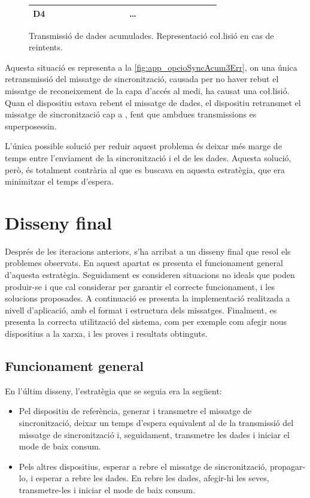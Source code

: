 \documentclass{tfgitic}[2024/07/01]
\begin{document}
{\begin{figure}[ht]
{\begin{tabular}{!{\vrule width \heavyrulewidth}c!{\vrule width \heavyrulewidth}ccccccccccc!{\vrule width \heavyrulewidth}}
{D4} & ~~~~~~~~~~~~~~ & & ~~~~~~~~~~~~~~\\

\toprule
\end{tabular}
}
    \caption{Transmissió de dades acumulades. Representació co\l.lisió en cas de reintents.}
    \label{fig:app_opcioSyncAcum3Err}
\end{figure}

Aquesta situació es representa a la \autoref{fig:app_opcioSyncAcum3Err}, on una única retransmissió del missatge de sincronització, causada per no haver rebut el missatge de reconeixement de la capa d'accés al medi, ha causat una co\l.lisió. Quan el dispositiu  estava rebent el missatge de dades, el dispositiu  retransmet el missatge de sincronització cap a , fent que ambdues transmissions es superposessin.

L'única possible solució per reduir aquest problema és deixar més marge de temps entre l'enviament de la sincronització i el de les dades. Aquesta solució, però, és totalment contrària al que es buscava en aquesta estratègia, que era minimitzar el temps d'espera.


\section{Disseny final}
Després de les iteracions anteriors, s'ha arribat a un disseny final que resol els problemes observats. En aquest apartat es presenta el funcionament general d'aquesta estratègia. Seguidament es consideren situacions no ideals que poden produir-se i que cal considerar per garantir el correcte funcionament, i les solucions proposades. A continuació es presenta la implementació realitzada a nivell d'aplicació, amb el format i estructura dels missatges. Finalment, es presenta la correcta utilització del sistema, com per exemple com afegir nous dispositius a la xarxa, i les proves i resultats obtinguts.

\subsection{Funcionament general}
En l'últim disseny, l'estratègia que se seguia era la següent:
\begin{itemize}
    \item Pel dispositiu de referència, generar i transmetre el missatge de sincronització, deixar un temps d'espera equivalent al de la transmissió del missatge de sincronització i, seguidament, transmetre les dades i iniciar el mode de baix consum.
    \item Pels altres dispositius, esperar a rebre el missatge de sincronització, propagar-lo, i esperar a rebre les dades. En rebre les dades, afegir-hi les seves, transmetre-les i iniciar el mode de baix consum.
\end{itemize}

}
\end{document}
